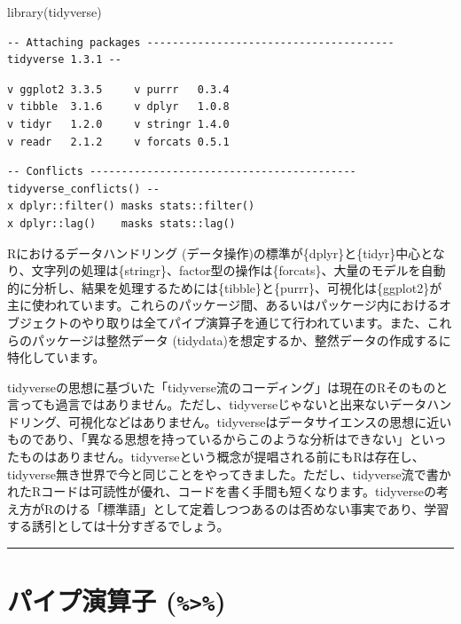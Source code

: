 \documentclass[
  a4paper,
  pandoc,
  ja=standard,
  jafont=haranoaji]{bxjsbook}
\newenvironment{Shaded}{\begin{snugshade}}{\end{snugshade}}
\newcommand{\FunctionTok}[1]{\textcolor[rgb]{0.28,0.35,0.67}{#1}}
\newcommand{\NormalTok}[1]{\textcolor[rgb]{0.00,0.48,0.65}{#1}}
\begin{document}
\begin{Shaded}
\begin{Highlighting}[numbers=left,,]
\FunctionTok{library}\NormalTok{(tidyverse)}
\end{Highlighting}
\end{Shaded}

\begin{verbatim}
-- Attaching packages --------------------------------------- tidyverse 1.3.1 --
\end{verbatim}

\begin{verbatim}
v ggplot2 3.3.5     v purrr   0.3.4
v tibble  3.1.6     v dplyr   1.0.8
v tidyr   1.2.0     v stringr 1.4.0
v readr   2.1.2     v forcats 0.5.1
\end{verbatim}

\begin{verbatim}
-- Conflicts ------------------------------------------ tidyverse_conflicts() --
x dplyr::filter() masks stats::filter()
x dplyr::lag()    masks stats::lag()
\end{verbatim}

Rにおけるデータハンドリング
(データ操作)の標準が\{dplyr\}と\{tidyr\}中心となり、文字列の処理は\{stringr\}、factor型の操作は\{forcats\}、大量のモデルを自動的に分析し、結果を処理するためには\{tibble\}と\{purrr\}、可視化は\{ggplot2\}が主に使われています。これらのパッケージ間、あるいはパッケージ内におけるオブジェクトのやり取りは全てパイプ演算子を通じて行われています。また、これらのパッケージは整然データ
(tidydata)を想定するか、整然データの作成するに特化しています。

tidyverseの思想に基づいた「tidyverse流のコーディング」は現在のRそのものと言っても過言ではありません。ただし、tidyverseじゃないと出来ないデータハンドリング、可視化などはありません。tidyverseはデータサイエンスの思想に近いものであり、「異なる思想を持っているからこのような分析はできない」といったものはありません。tidyverseという概念が提唱される前にもRは存在し、tidyverse無き世界で今と同じことをやってきました。ただし、tidyverse流で書かれたRコードは可読性が優れ、コードを書く手間も短くなります。tidyverseの考え方がRのける「標準語」として定着しつつあるのは否めない事実であり、学習する誘引としては十分すぎるでしょう。

\begin{center}\rule{0.5\linewidth}{0.5pt}\end{center}

\hypertarget{sec-handling1_pipe}{%
\section{\texorpdfstring{パイプ演算子
(\texttt{\%\textgreater{}\%})}{パイプ演算子 (\%\textgreater\%)}}\label{sec-handling1_pipe}}
\end{document}
